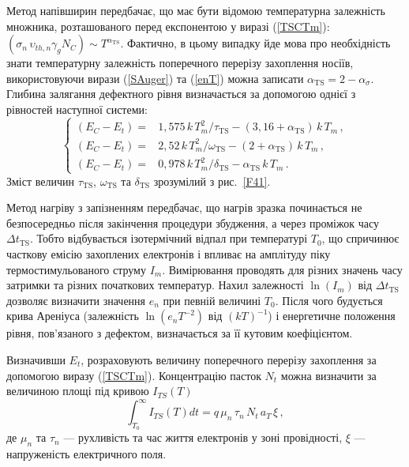 \documentclass[10pt,a5paper,titlepage,oneside]{book}
\numberwithin{equation}{part}
\begin{document}
Метод напівширин передбачає, що має бути відомою температурна залежність
множника, розташованого перед експонентою у виразі (\ref{TSCTm}):
$(\sigma_n\,\upsilon_{th,n}\gamma_g N_C)\sim T^{\alpha_{\mathrm{TS}}}$.
Фактично, в цьому випадку йде мова про необхідність знати температурну залежність
поперечного перерізу захоплення носіїв,
використовуючи вирази (\ref{SAuger}) та (\ref{enT}) можна записати $\alpha_{\mathrm{TS}}=2-\alpha_\sigma$.
Глибина залягання дефектного рівня визначається
за допомогою однієї з рівностей наступної системи:
\begin{equation}\label{TSCsemi}
\left\{
\begin{aligned}%
(E_C-E_t)=&1,575\,k\,T_m^2/\tau_{\mathrm{TS}} -(3,16+\alpha_{\mathrm{TS}})\,k\,T_m\,,\\
(E_C-E_t)=&2,52\,k\,T_m^2/\omega_{\mathrm{TS}} -(2+\alpha_{\mathrm{TS}})\,k\,T_m\,,\\
(E_C-E_t)=&0,978\,k\,T_m^2/\delta_{\mathrm{TS}} -\alpha_{\mathrm{TS}}\,k\,T_m\,.
\end{aligned} \right.
\end{equation}
Зміст величин $\tau_{\mathrm{TS}}$, $\omega_{\mathrm{TS}}$ та $\delta_{\mathrm{TS}}$
зрозумілий з рис.~\ref{F41}.

Метод нагріву з запізненням передбачає,
що нагрів зразка починається не безпосередньо після закінчення
процедури збудження,
а через проміжок часу $\Delta t_\mathrm{TS}$.
Тобто відбувається ізотермічний відпал при температурі $T_0$,
що спричинює часткову емісію захоплених електронів і впливає
на амплітуду піку термостимульованого струму $I_m$.
Вимірювання проводять для різних значень часу
затримки та різних початкових температур.
Нахил залежності $\ln(I_m)$ від $\Delta t_\mathrm{TS}$
дозволяє визначити значення $e_n$ при певній величині $T_0$.
Після чого будується крива Ареніуса
(залежність $\ln(e_nT^{-2})$ від $(kT)^{-1}$) і енергетичне
положення рівня, пов'язаного з дефектом, визначається за її кутовим
коефіцієнтом.

Визначивши $E_t$, розраховують величину поперечного перерізу захоплення за допомогою виразу (\ref{TSCTm}).
Концентрацію пасток $N_t$ можна визначити за величиною площі під
кривою $I_{TS}(T)$
\begin{equation}
\label{TSCNt}
\int_{T_0}^\infty I_{TS}(T) dt=q\,\mu_n\,\tau_n\,N_t\,a_T\,\xi\,,
\end{equation}
де
$\mu_n$ та $\tau_n$ --- рухливість та час життя електронів у зоні провідності,
$\xi$ --- напруженість електричного поля.
\end{document}
